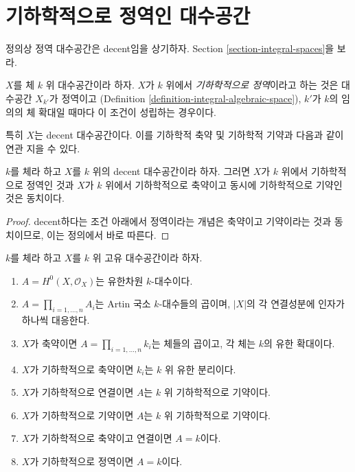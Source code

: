 \section{기하학적으로 정역인 대수공간}
\label{section-geometrically-integral}

\noindent
정의상 정역 대수공간은 decent임을 상기하자. Section
\ref{section-integral-spaces}을 보라.

\begin{definition}
\label{definition-geometrically-integral}
$X$를 체 $k$ 위 대수공간이라 하자. $X$가 $k$ 위에서
{\it 기하학적으로 정역}이라고 하는 것은 대수공간 $X_{k'}$가 정역이고
(Definition \ref{definition-integral-algebraic-space}), $k'$가 $k$의 임의의
체 확대일 때마다 이 조건이 성립하는 경우이다.
\end{definition}

\noindent
특히 $X$는 decent 대수공간이다. 이를 기하학적 축약 및 기하학적 기약과
다음과 같이 연관 지을 수 있다.

\begin{lemma}
\label{lemma-geometrically-integral}
$k$를 체라 하고 $X$를 $k$ 위의 decent 대수공간이라 하자. 그러면 $X$가
$k$ 위에서 기하학적으로 정역인 것과 $X$가 $k$ 위에서 기하학적으로
축약이고 동시에 기하학적으로 기약인 것은 동치이다.
\end{lemma}

\begin{proof}
decent하다는 조건 아래에서 정역이라는 개념은 축약이고 기약이라는 것과
동치이므로, 이는 정의에서 바로 따른다.
\end{proof}

\begin{lemma}
\label{lemma-proper-geometrically-reduced-global-sections}
$k$를 체라 하고 $X$를 $k$ 위 고유 대수공간이라 하자.
\begin{enumerate}
\item $A = H^0(X, \mathcal{O}_X)$는 유한차원 $k$-대수이다.
\item $A = \prod_{i = 1, \ldots, n} A_i$는 Artin 국소 $k$-대수들의 곱이며,
$|X|$의 각 연결성분에 인자가 하나씩 대응한다.
\item $X$가 축약이면 $A = \prod_{i = 1, \ldots, n} k_i$는 체들의 곱이고,
각 체는 $k$의 유한 확대이다.
\item $X$가 기하학적으로 축약이면 $k_i$는 $k$ 위 유한 분리이다.
\item $X$가 기하학적으로 연결이면 $A$는 $k$ 위 기하학적으로 기약이다.
\item $X$가 기하학적으로 기약이면 $A$는 $k$ 위 기하학적으로 기약이다.
\item $X$가 기하학적으로 축약이고 연결이면 $A = k$이다.
\item $X$가 기하학적으로 정역이면 $A = k$이다.
\end{enumerate}
\end{lemma}


